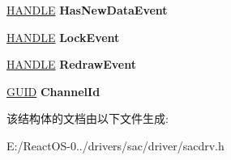 \begin{DoxyCompactItemize}
\hyperlink{interfacevoid}{H\+A\+N\+D\+LE} {\bfseries Has\+New\+Data\+Event}
\item 
\mbox{\label{struct___s_a_c___c_h_a_n_n_e_l___a_t_t_r_i_b_u_t_e_s_ac32a827a1b91a38a571dbe2dfe6986a4}} 
\hyperlink{interfacevoid}{H\+A\+N\+D\+LE} {\bfseries Lock\+Event}
\item 
\mbox{\label{struct___s_a_c___c_h_a_n_n_e_l___a_t_t_r_i_b_u_t_e_s_aa1fba5aabe70b321109e48a10d13a8e4}} 
\hyperlink{interfacevoid}{H\+A\+N\+D\+LE} {\bfseries Redraw\+Event}
\item 
\mbox{\label{struct___s_a_c___c_h_a_n_n_e_l___a_t_t_r_i_b_u_t_e_s_a231ba49e24659a9f2f7a6a98a6b1ed2a}} 
\hyperlink{interface_g_u_i_d}{G\+U\+ID} {\bfseries Channel\+Id}
\end{DoxyCompactItemize}


该结构体的文档由以下文件生成\+:\begin{DoxyCompactItemize}
\item 
E\+:/\+React\+O\+S-\/0../drivers/sac/driver/sacdrv.\+h\end{DoxyCompactItemize}
